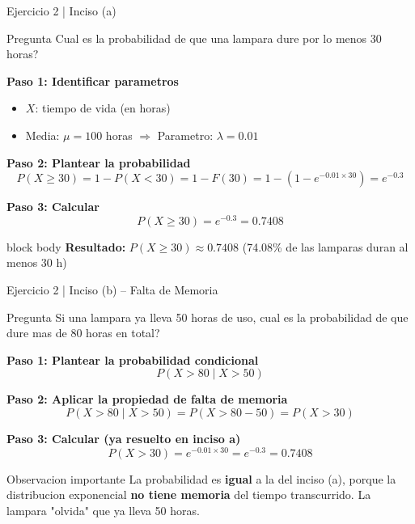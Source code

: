 \documentclass[10pt]{beamer}
\begin{document}
\begin{frame}{Ejercicio 2 | Inciso (a)}
\begin{exampleblock}{Pregunta}
Cual es la probabilidad de que una lampara dure por lo menos 30 horas?
\end{exampleblock}

\vspace{0.2cm}
\textbf{Paso 1: Identificar parametros}
\begin{itemize}
    \item $X$: tiempo de vida (en horas)
    \item Media: $\mu = 100$ horas $\Rightarrow$ Parametro: $\lambda = 0.01$
\end{itemize}

\vspace{0.1cm}
\textbf{Paso 2: Plantear la probabilidad}
\[
P(X \geq 30) = 1 - P(X < 30) = 1 - F(30) = 1 - \left(1 - e^{-0.01 \times 30}\right) = e^{-0.3}
\]

\vspace{0.1cm}
\textbf{Paso 3: Calcular}
\[
P(X \geq 30) = e^{-0.3} = \boxed{0.7408}
\]

\vspace{0.2cm}
\begin{beamercolorbox}[rounded=true,shadow=true,wd=\linewidth]{block body}
\centering
\textbf{Resultado:} $P(X \geq 30) \approx 0.7408$ (74.08\% de las lamparas duran al menos 30 h)
\end{beamercolorbox}
\end{frame}

\begin{frame}{Ejercicio 2 | Inciso (b) -- Falta de Memoria}
\begin{exampleblock}{Pregunta}
Si una lampara ya lleva 50 horas de uso, cual es la probabilidad de que dure mas de 80 horas en total?
\end{exampleblock}

\vspace{0.2cm}
\textbf{Paso 1: Plantear la probabilidad condicional}
\[
P(X > 80 \mid X > 50)
\]

\vspace{0.1cm}
\textbf{Paso 2: Aplicar la propiedad de falta de memoria}
\[
P(X > 80 \mid X > 50) = P(X > 80 - 50) = P(X > 30)
\]

\vspace{0.1cm}
\textbf{Paso 3: Calcular (ya resuelto en inciso a)}
\[
P(X > 30) = e^{-0.01 \times 30} = e^{-0.3} = \boxed{0.7408}
\]

\vspace{0.2cm}
\begin{alertblock}{Observacion importante}
La probabilidad es \textbf{igual} a la del inciso (a), porque la distribucion exponencial \textbf{no tiene memoria} del tiempo transcurrido. La lampara "olvida" que ya lleva 50 horas.
\end{alertblock}
\end{frame}
\end{document}
